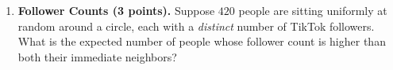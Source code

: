 \documentclass[11pt]{article}
\begin{document}
\begin{enumerate}[label=\arabic*., resume]

    \newpage

    \item \textbf{Follower Counts (3 points).}
        Suppose $420$ people are sitting uniformly at random around a circle, each with a
        \emph{distinct} number of TikTok followers. What is the expected number of
        people whose follower count is higher than both their immediate neighbors?


\end{enumerate}
\end{document}
